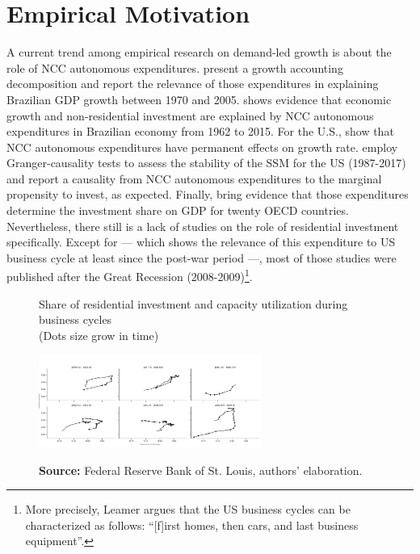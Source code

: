 \documentclass[11pt]{article}
\begin{document}
\section{Empirical Motivation}
\label{sec:org86a3cc1}
\label{sec:empirical}

A current trend among empirical research on demand-led growth is about the role of NCC autonomous expenditures.
\textcite{freitas_pattern_2013} present a growth accounting decomposition and report the relevance of those expenditures in explaining Brazilian GDP growth between 1970 and 2005. \textcite{braga_investment_2018} shows evidence that economic growth and non-residential investment are explained by NCC autonomous expenditures in Brazilian economy from 1962 to 2015. For the U.S., \textcite{girardi_long-run_2016} show that NCC autonomous expenditures have permanent effects on growth rate. 
\textcite{haluska_growth_2019} employ Granger-causality tests to assess the stability of the SSM for the US (1987-2017) and report a causality from NCC autonomous expenditures to the marginal propensity to invest, as expected.
Finally, \textcite{girardi_autonomous_2018} bring evidence that those expenditures determine the investment share on GDP for twenty OECD countries. 
Nevertheless, there still is a lack of studies on the role of residential investment specifically. 
Except for \textcites{green_follow_1997}{leamer_housing_2007} ---  which shows the relevance of this expenditure to US business cycle at least since the
post-war period ---, most of those studies were published after the Great Recession (2008-2009)\footnote{More precisely, Leamer \textcite[p.~8]{leamer_housing_2007} argues that the US business cycles can be characterized as follows: ``[f]irst homes, then cars, and last business equipment''.}.



\begin{figure}[htb]
    \centering
        \caption{Share of residential investment and capacity utilization during business cycles\\\centering (Dots size grow in  time)} 
    \includegraphics[width = 0.65\textwidth]{./figs/cycles.png}
    \label{fig:cycles}
    \caption*{\textbf{Source:} Federal Reserve Bank of St. Louis, authors’ elaboration.}
\end{figure}
\end{document}
